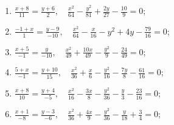 \begin{enumerate}
			\item \( \displaystyle \frac{x+8}{11} = \frac{y+6}{2}, \quad \frac{x^2}{64} - \frac{y^2}{81} + \frac{2 y}{27} - \frac{10}{9} = 0 \);
			\item \( \displaystyle \frac{-1+x}{1} = \frac{y-9}{-10}, \quad \frac{x^2}{64} - \frac{x}{16} - y^2 + 4 y - \frac{79}{16} = 0 \);
			\item \( \displaystyle \frac{x+5}{-1} = \frac{y}{-10}, \quad \frac{x^2}{49} + \frac{10 x}{49} - \frac{y^2}{9} - \frac{24}{49} = 0 \);
			\item \( \displaystyle \frac{5+x}{-1} = \frac{y+10}{15}, \quad \frac{x^2}{36} + \frac{x}{6} - \frac{y^2}{16} - \frac{7 y}{8} - \frac{61}{16} = 0 \);
			\item \( \displaystyle \frac{x+8}{10} = \frac{y+4}{-5}, \quad \frac{x^2}{16} - \frac{3 x}{8} - \frac{y^2}{36} - \frac{y}{3} - \frac{23}{16} = 0 \);
			\item \( \displaystyle \frac{x+1}{-8} = \frac{y-3}{-6}, \quad \frac{x^2}{36} + \frac{4 x}{9} - \frac{y^2}{36} - \frac{y}{18} + \frac{3}{4} = 0 \);

		\setcounter{tasks}{\value{enumi}}
	\end{enumerate}